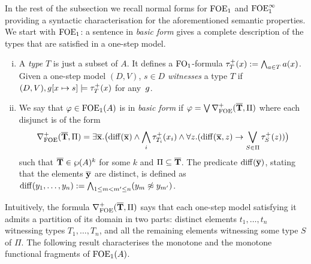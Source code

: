 In the rest of the subsection we recall normal forms for $\mathrm{FOE}_1$ and $\mathrm{FOE}^{\infty}_1$ providing a syntactic characterisation for the aforementioned semantic properties. We start with $\mathrm{FOE}_1$: a sentence in \emph{basic form} gives a complete description of the types that are satisfied in a one-step model.

\begin{definition}%
\begin{enumerate}[(i)]
\item A \emph{type} $T$ is just a subset of $A$. It defines a $\mathrm{FO}_1$-formula $\tau^{+}_T(x) \mathrel{: =} \bigwedge_{a \in T} a(x)$. Given a one-step model $(D,V)$, $s \in D$ \emph{witnesses} a type $T$ if $(D,V), g[x\mapsto s] \models \tau^{+}_T(x)$ for any~$g$.
\item We say that $\varphi \in \mathrm{FOE}_1(A)$ is in \emph{basic form} if $\varphi = \bigvee \nabla^+_{\mathrm{FOE}}(\overline{{\mathbf{T}}},\Pi)$ where each disjunct is of the form
%
\begin{equation*}%
\posdbnfofoe{\vlist{T}}{\Pi} = \exists \vlist{x}.\big(\arediff{\vlist{x}} \land \bigwedge_i \tau^{+}_{T_i}(x_i) \land \forall z.(\arediff{\vlist{x},z} \lthen \bigvee_{S\in \Pi} \tau^{+}_S(z))\big)
\end{equation*}
%
such that $\overline{{\mathbf{T}}} \in \wp(A)^k$ for some $k$ and $\Pi \subseteq \overline{{\mathbf{T}}}$.  The predicate $\mathrm{diff}(\overline{{\mathbf{y}}})$, stating that the elements $\overline{{\mathbf{y}}}$ are distinct, is defined as $\mathrm{diff}(y_1,\dots,y_n) := \bigwedge_{1\leq m < m^{\prime} \leq n} (y_m \not\approx y_{m^{\prime}})$.
\end{enumerate}
\end{definition}

Intuitively, the formula $\nabla^+_{\mathrm{FOE}}(\overline{{\mathbf{T}}},\Pi)$ says that each one-step model satisfying it admits a partition of its domain in two parts: distinct elements $t_1,\dots,t_n$ witnessing types $T_1,\dots,T_n$, and all the remaining elements witnessing some type $S$ of $\Pi$. The following result characterises the monotone and the monotone functional fragments of $\mathrm{FOE}_1(A)$.


